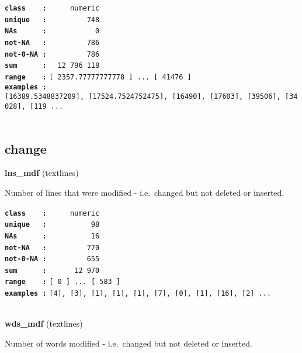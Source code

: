 \documentclass[]{article}
\begin{document}
\textbf{\texttt{class\ \ \ \ :}} \texttt{~~~~~numeric}\\
\textbf{\texttt{unique\ \ \ :}} \texttt{~~~~~~~~~748}\\
\textbf{\texttt{NAs\ \ \ \ \ \ :}} \texttt{~~~~~~~~~~~0}\\
\textbf{\texttt{not-NA\ \ \ :}} \texttt{~~~~~~~~~786}\\
\textbf{\texttt{not-0-NA\ :}} \texttt{~~~~~~~~~786}\\
\textbf{\texttt{sum\ \ \ \ \ \ :}} \texttt{~~12~796~118}\\
\textbf{\texttt{range\ \ \ \ :}}
\texttt{{[}\ 2357.77777777778\ {]}\ ...\ {[}\ 41476\ {]}}\\
\textbf{\texttt{examples\ :}}
\texttt{{[}16389.5348837209{]},\ {[}17524.7524752475{]},\ {[}16490{]},\ {[}17603{]},\ {[}39506{]},\ {[}34028{]},\ {[}119\ ...}\\

~

\subsection{change}\label{change}

\textbf{lns\_mdf} (textlines)

Number of lines that were modified - i.e.~changed but not deleted or
inserted.

\textbf{\texttt{class\ \ \ \ :}} \texttt{~~~~~numeric}\\
\textbf{\texttt{unique\ \ \ :}} \texttt{~~~~~~~~~~98}\\
\textbf{\texttt{NAs\ \ \ \ \ \ :}} \texttt{~~~~~~~~~~16}\\
\textbf{\texttt{not-NA\ \ \ :}} \texttt{~~~~~~~~~770}\\
\textbf{\texttt{not-0-NA\ :}} \texttt{~~~~~~~~~655}\\
\textbf{\texttt{sum\ \ \ \ \ \ :}} \texttt{~~~~~~12~970}\\
\textbf{\texttt{range\ \ \ \ :}}
\texttt{{[}\ 0\ {]}\ ...\ {[}\ 583\ {]}}\\
\textbf{\texttt{examples\ :}}
\texttt{{[}4{]},\ {[}3{]},\ {[}1{]},\ {[}1{]},\ {[}1{]},\ {[}7{]},\ {[}0{]},\ {[}1{]},\ {[}16{]},\ {[}2{]}\ ...}\\

~

\textbf{wds\_mdf} (textlines)

Number of words modified - i.e.~changed but not deleted or inserted.
\end{document}
